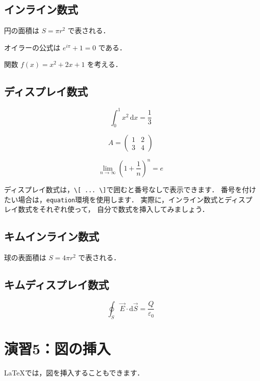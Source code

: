 \documentclass[a4paper,twocolumn,pdflatex,ja=standard]{bxjsarticle}
\newcommand{\dif}{\mathrm{d}}
\begin{document}
\subsection*{インライン数式}
円の面積は $S=\pi r^2$ で表される．

オイラーの公式は $e^{i\pi}+1=0$ である．

関数 $f(x)=x^2+2x+1$ を考える．

\subsection*{ディスプレイ数式}
\begin{equation}
\int_{0}^{1} x^2\,\dif x=\frac{1}{3}
\label{eq:integral}
\end{equation}

\begin{equation}
A=
\begin{pmatrix}
1 & 2\\
3 & 4
\end{pmatrix}
\label{eq:matrix}
\end{equation}

\begin{equation}
\lim_{n\to\infty}
{\left(1+\frac{1}{n}\right)}^n=e
\label{eq:euler}
\end{equation}

ディスプレイ数式は，\verb|\[ ... \]|で囲むと番号なしで表示できます．
番号を付けたい場合は，\verb|equation|環境を使用します．
実際に，インライン数式とディスプレイ数式をそれぞれ使って，
自分で数式を挿入してみましょう．


\subsection*{キムインライン数式}
球の表面積は $S=4\pi r^2$ で表される．

\subsection*{キムディスプレイ数式}
\begin{equation}
\oint_{S} \vec{E}\cdot \dif\vec{S}
=\frac{Q}{\varepsilon_0}
\label{eq:gauss}
\end{equation}


\section*{演習5：図の挿入}
LaTeXでは，図を挿入することもできます．
\end{document}
